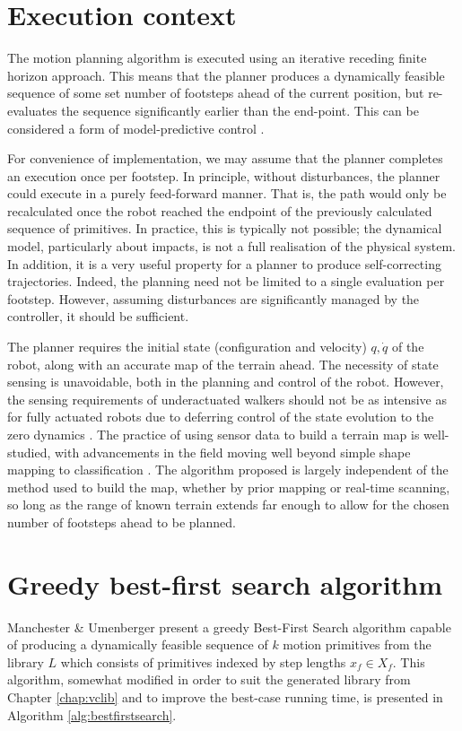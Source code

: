 \section{Execution context}
The motion planning algorithm is executed using an iterative receding finite horizon approach. This means that the planner produces a dynamically feasible sequence of some set number of footsteps ahead of the current position, but re-evaluates the sequence significantly earlier than the end-point. This can be considered a form of model-predictive control \cite{camacho2013model}.

For convenience of implementation, we may assume that the planner completes an execution once per footstep. In principle, without disturbances, the planner could execute in a purely feed-forward manner. That is, the path would only be recalculated once the robot reached the endpoint of the previously calculated sequence of primitives. In practice, this is typically not possible; the dynamical model, particularly about impacts, is not a full realisation of the physical system. In addition, it is a very useful property for a planner to produce self-correcting trajectories. Indeed, the planning need not be limited to a single evaluation per footstep. However, assuming disturbances are significantly managed by the controller, it should be sufficient.

The planner requires the initial state (configuration and velocity) $q,\dot{q}$ of the robot, along with an accurate map of the terrain ahead. The necessity of state sensing is unavoidable, both in the planning and control of the robot. However, the sensing requirements of underactuated walkers should not be as intensive as for fully actuated robots due to deferring control of the state evolution to the zero dynamics \cite{collins2005efficient}. The practice of using sensor data to build a terrain map is well-studied, with advancements in the field moving well beyond simple shape mapping to classification \cite{herbert1989terrain, triebel2006multi, brooks2007self}. The algorithm proposed is largely independent of the method used to build the map, whether by prior mapping or real-time scanning, so long as the range of known terrain extends far enough to allow for the chosen number of footsteps ahead to be planned.

\section{Greedy best-first search algorithm}
Manchester \& Umenberger \cite{manchester13planning} present a greedy Best-First Search algorithm capable of producing a dynamically feasible sequence of $k$ motion primitives from the library $L$ which consists of primitives indexed by step lengths $x_f\in X_f$. This algorithm, somewhat modified in order to suit the generated library from Chapter \ref{chap:vclib} and to improve the best-case running time, is presented in Algorithm \ref{alg:bestfirstsearch}. 

